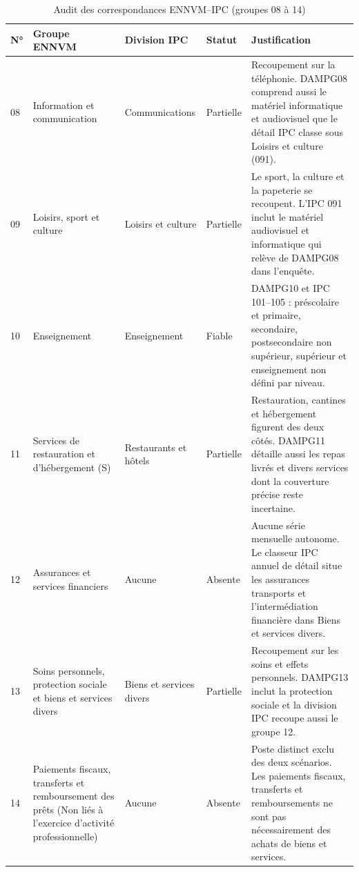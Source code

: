 \clearpage
\begin{table}[!ht]
\centering\small
\setlength{\tabcolsep}{4pt}
\caption{Audit des correspondances ENNVM--IPC (groupes 08 à 14)}
\begin{tabular}{@{}l>{\raggedright\arraybackslash}p{}>{\raggedright\arraybackslash}p{}l>{\raggedright\arraybackslash}p{}@{}}
\hline
N° & Groupe ENNVM & Division IPC & Statut & Justification \\
\hline
08 & Information et communication & Communications & Partielle & Recoupement sur la téléphonie. DAMPG08 comprend aussi le matériel informatique et audiovisuel que le détail IPC classe sous Loisirs et culture (091). \\
\hline
09 & Loisirs, sport et culture & Loisirs et culture & Partielle & Le sport, la culture et la papeterie se recoupent. L'IPC 091 inclut le matériel audiovisuel et informatique qui relève de DAMPG08 dans l'enquête. \\
\hline
10 & Enseignement & Enseignement & Fiable & DAMPG10 et IPC 101--105 : préscolaire et primaire, secondaire, postsecondaire non supérieur, supérieur et enseignement non défini par niveau. \\
\hline
11 & Services de restauration et d'hébergement (S) & Restaurants et hôtels & Partielle & Restauration, cantines et hébergement figurent des deux côtés. DAMPG11 détaille aussi les repas livrés et divers services dont la couverture précise reste incertaine. \\
\hline
12 & Assurances et services financiers & Aucune & Absente & Aucune série mensuelle autonome. Le classeur IPC annuel de détail situe les assurances transports et l'intermédiation financière dans Biens et services divers. \\
\hline
13 & Soins personnels, protection sociale et biens et services divers & Biens et services divers & Partielle & Recoupement sur les soins et effets personnels. DAMPG13 inclut la protection sociale et la division IPC recoupe aussi le groupe 12. \\
\hline
14 & Paiements fiscaux, transferts et remboursement des prêts (Non liés à l'exercice d'activité professionnelle) & Aucune & Absente & Poste distinct exclu des deux scénarios. Les paiements fiscaux, transferts et remboursements ne sont pas nécessairement des achats de biens et services. \\
\hline
\end{tabular}
\end{table}
